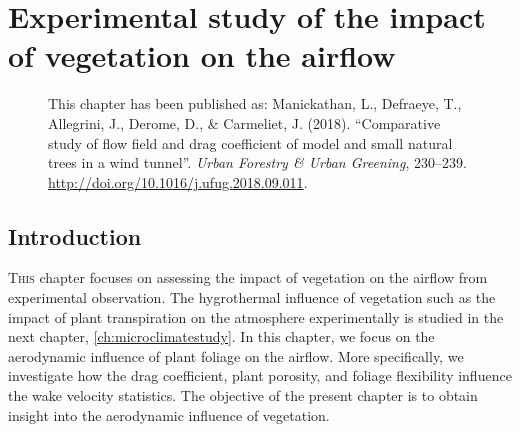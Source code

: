 \chapter{Experimental study of the impact of vegetation on the airflow}
\label{ch:paper2}

\def\figdir{chapters/ch03_experimentalstudymodels/figures}

\begin{figure}[h]
	\centering
	\begin{minipage}{0.9\textwidth}
		\textsf{ \footnotesize This chapter has been published as: Manickathan, L., Defraeye, T., Allegrini, J., Derome, D., \& Carmeliet, J. (2018). ``Comparative study of flow field and drag coefficient of model and small natural trees in a wind tunnel''. \textit{Urban Forestry \& Urban Greening}, 230–239. \url{http://doi.org/10.1016/j.ufug.2018.09.011}.}
	\end{minipage}
\end{figure}
\vspace{2em}

\section{Introduction}

\lettrine[lines=3,nindent=0em,loversize=0.1]{T}{his} chapter focuses on assessing the impact of vegetation on the airflow from experimental observation. The hygrothermal influence of vegetation such as the impact of plant transpiration on the atmosphere experimentally is studied in the next chapter, \cref{ch:microclimatestudy}. In this chapter, we focus on the aerodynamic influence of plant foliage on the airflow. More specifically, we investigate how the drag coefficient, plant porosity, and foliage flexibility influence the wake velocity statistics. The objective of the present chapter is to obtain insight into the aerodynamic influence of vegetation.

